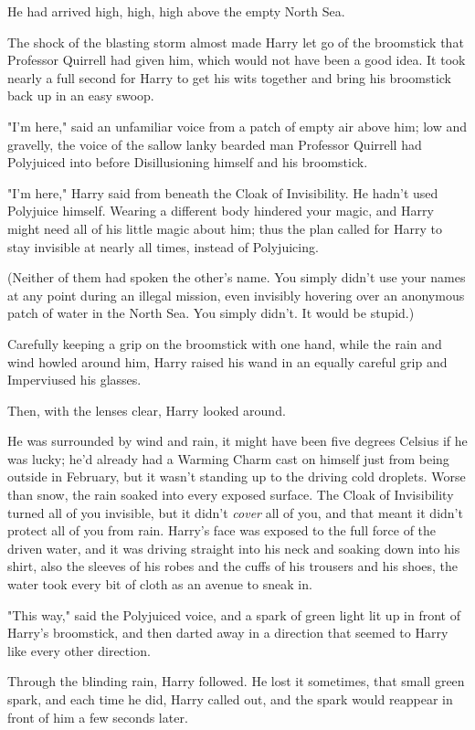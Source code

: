 He had arrived high, high, high above the empty North Sea.

The shock of the blasting storm almost made Harry let go of the broomstick that
Professor Quirrell had given him, which would not have been a good idea. It
took nearly a full second for Harry to get his wits together and bring his
broomstick back up in an easy swoop.

"I'm here," said an unfamiliar voice from a patch of empty air above him; low
and gravelly, the voice of the sallow lanky bearded man Professor Quirrell had
Polyjuiced into before Disillusioning himself and his broomstick.

"I'm here," Harry said from beneath the Cloak of Invisibility. He hadn't used
Polyjuice himself. Wearing a different body hindered your magic, and Harry
might need all of his little magic about him; thus the plan called for Harry to
stay invisible at nearly all times, instead of Polyjuicing.

(Neither of them had spoken the other's name. You simply didn't use your names
at any point during an illegal mission, even invisibly hovering over an
anonymous patch of water in the North Sea. You simply didn't. It would be
stupid.)

Carefully keeping a grip on the broomstick with one hand, while the rain and
wind howled around him, Harry raised his wand in an equally careful grip and
Imperviused his glasses.

Then, with the lenses clear, Harry looked around.

He was surrounded by wind and rain, it might have been five degrees Celsius if
he was lucky; he'd already had a Warming Charm cast on himself just from being
outside in February, but it wasn't standing up to the driving cold droplets.
Worse than snow, the rain soaked into every exposed surface. The Cloak of
Invisibility turned all of you invisible, but it didn't \emph{cover} all of
you, and that meant it didn't protect all of you from rain. Harry's face was
exposed to the full force of the driven water, and it was driving straight into
his neck and soaking down into his shirt, also the sleeves of his robes and the
cuffs of his trousers and his shoes, the water took every bit of cloth as an
avenue to sneak in.

"This way," said the Polyjuiced voice, and a spark of green light lit up in
front of Harry's broomstick, and then darted away in a direction that seemed to
Harry like every other direction.

Through the blinding rain, Harry followed. He lost it sometimes, that small
green spark, and each time he did, Harry called out, and the spark would
reappear in front of him a few seconds later.

